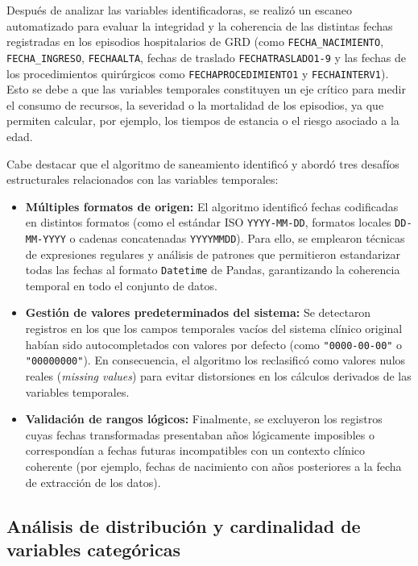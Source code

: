 Después de analizar las variables identificadoras, se realizó un escaneo automatizado para evaluar la integridad y la coherencia de las distintas fechas registradas en los episodios hospitalarios de GRD (como \texttt{FECHA\_NACIMIENTO}, \texttt{FECHA\_INGRESO}, \texttt{FECHAALTA}, fechas de traslado \texttt{FECHATRASLADO1-9} y las fechas de los procedimientos quirúrgicos como \texttt{FECHAPROCEDIMIENTO1} y \texttt{FECHAINTERV1}). Esto se debe a que las variables temporales constituyen un eje crítico para medir el consumo de recursos, la severidad o la mortalidad de los episodios, ya que permiten calcular, por ejemplo, los tiempos de estancia o el riesgo asociado a la edad.

Cabe destacar que el algoritmo de saneamiento identificó y abordó tres desafíos estructurales relacionados con las variables temporales:

\begin{itemize}
    \item \textbf{Múltiples formatos de origen:} El algoritmo identificó fechas codificadas en distintos formatos (como el estándar ISO \texttt{YYYY-MM-DD}, formatos locales \texttt{DD-MM-YYYY} o cadenas concatenadas \texttt{YYYYMMDD}). Para ello, se emplearon técnicas de expresiones regulares y análisis de patrones que permitieron estandarizar todas las fechas al formato \texttt{Datetime} de Pandas, garantizando la coherencia temporal en todo el conjunto de datos.
    \item \textbf{Gestión de valores predeterminados del sistema:} Se detectaron registros en los que los campos temporales vacíos del sistema clínico original habían sido autocompletados con valores por defecto (como \texttt{"0000-00-00"} o \texttt{"00000000"}). En consecuencia, el algoritmo los reclasificó como valores nulos reales (\textit{missing values}) para evitar distorsiones en los cálculos derivados de las variables temporales.
    \item \textbf{Validación de rangos lógicos:} Finalmente, se excluyeron los registros cuyas fechas transformadas presentaban años lógicamente imposibles o correspondían a fechas futuras incompatibles con un contexto clínico coherente (por ejemplo, fechas de nacimiento con años posteriores a la fecha de extracción de los datos).
\end{itemize}


\subsection{Análisis de distribución y cardinalidad de variables categóricas}

